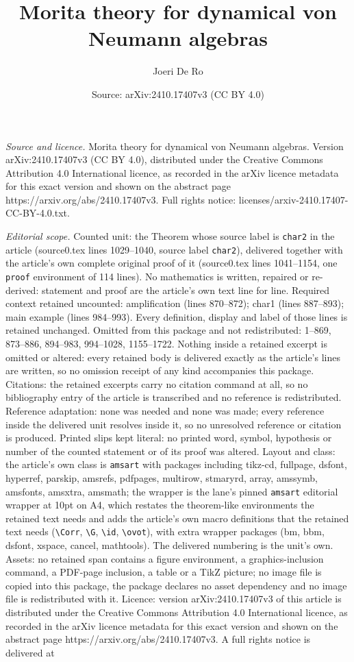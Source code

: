 \documentclass[10pt,a4paper]{amsart}
\title[Morita theory for dynamical von Neumann algebras]{Morita theory for dynamical von Neumann algebras}
\author{Joeri De Ro}
\date{Source: arXiv:2410.17407v3 (CC BY 4.0)}
\begin{document}
\maketitle

\noindent\emph{Source and licence.} Morita theory for dynamical von Neumann algebras. Version arXiv:2410.17407v3 (CC BY 4.0), distributed under the Creative Commons Attribution 4.0 International licence, as recorded in the arXiv licence metadata for this exact version and shown on the abstract page https://arxiv.org/abs/2410.17407v3. Full rights notice: licenses/arxiv-2410.17407-CC-BY-4.0.txt.\par\smallskip

\noindent\textit{Editorial scope.} Counted unit: the Theorem whose source label is \texttt{char2} in the article (source0.tex lines 1029--1040, source label \texttt{char2}), delivered together with the article's own complete original proof of it (source0.tex lines 1041--1154, one \texttt{proof} environment of 114 lines). No mathematics is written, repaired or re-derived: statement and proof are the article's own text line for line. Required context retained uncounted: amplification (lines 870--872); char1 (lines 887--893); main example (lines 984--993). Every definition, display and label of those lines is retained unchanged. Omitted from this package and not redistributed: 1--869, 873--886, 894--983, 994--1028, 1155--1722. Nothing inside a retained excerpt is omitted or altered: every retained body is delivered exactly as the article's lines are written, so no omission receipt of any kind accompanies this package. Citations: the retained excerpts carry no citation command at all, so no bibliography entry of the article is transcribed and no reference is redistributed. Reference adaptation: none was needed and none was made; every reference inside the delivered unit resolves inside it, so no unresolved reference or citation is produced. Printed slips kept literal: no printed word, symbol, hypothesis or number of the counted statement or of its proof was altered. Layout and class: the article's own class is \texttt{amsart} with packages including tikz-cd, fullpage, dsfont, hyperref, parskip, amsrefs, pdfpages, multirow, stmaryrd, array, amssymb, amsfonts, amsxtra, amsmath; the wrapper is the lane's pinned \texttt{amsart} editorial wrapper at 10pt on A4, which restates the theorem-like environments the retained text needs and adds the article's own macro definitions that the retained text needs (\texttt{\textbackslash Corr}, \texttt{\textbackslash G}, \texttt{\textbackslash id}, \texttt{\textbackslash ovot}), with extra wrapper packages (bm, bbm, dsfont, xspace, cancel, mathtools). The delivered numbering is the unit's own. Assets: no retained span contains a figure environment, a graphics-inclusion command, a PDF-page inclusion, a table or a TikZ picture; no image file is copied into this package, the package declares no asset dependency and no image file is redistributed with it. Licence: version arXiv:2410.17407v3 of this article is distributed under the Creative Commons Attribution 4.0 International licence, as recorded in the arXiv licence metadata for this exact version and shown on the abstract page https://arxiv.org/abs/2410.17407v3. A full rights notice is delivered at 
\end{document}
